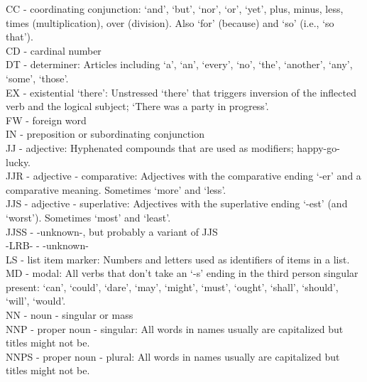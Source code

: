 %
%
%
%


CC - coordinating conjunction: `and', `but', `nor', `or', `yet', plus, minus, less, times (multiplication), over (division). Also `for' (because) and `so' (i.e., `so that').\\
CD - cardinal number\\
DT - determiner: Articles including `a', `an', `every', `no', `the', `another', `any', `some', `those'.\\
EX - existential `there': Unstressed `there' that triggers inversion of the inflected verb and the logical subject; `There was a party in progress'.\\
FW - foreign word\\
IN - preposition or subordinating conjunction\\
JJ - adjective: Hyphenated compounds that are used as modifiers; happy-go-lucky.\\
JJR - adjective - comparative: Adjectives with the comparative ending `-er' and a comparative meaning. Sometimes `more' and `less'.\\
JJS - adjective - superlative: Adjectives with the superlative ending `-est'
(and `worst'). Sometimes `most' and `least'.\\
JJSS - -unknown-, but probably a variant of JJS\\
-LRB- - -unknown-\\
LS - list item marker: Numbers and letters used as identifiers of items in a list.\\
MD - modal: All verbs that don't take an `-s' ending in the third person singular present: `can', `could', `dare', `may', `might', `must', `ought', `shall', `should', `will', `would'.\\
NN - noun - singular or mass\\
NNP - proper noun - singular: All words in names usually are capitalized but titles might not be.\\
NNPS - proper noun - plural: All words in names usually are capitalized but titles might not be.\\
